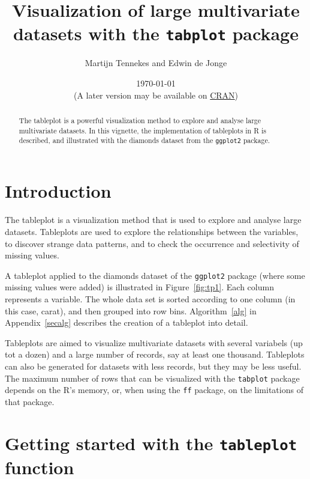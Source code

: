 \documentclass[11pt, fleqn, a4paper]{article}\usepackage[]{graphicx}\usepackage[]{color}
\title{Visualization of large multivariate datasets with the {\tt tabplot} package}
\author{Martijn Tennekes and Edwin de Jonge}
\date{\today\\ (A later version may be available on \href{http://cran.r-project.org/package=tabplot}{CRAN})}
\begin{document}

\maketitle
\begin{abstract}

The tableplot is a powerful visualization method to explore and analyse large multivariate datasets. In this vignette, the implementation of tableplots in R is described, and illustrated with the diamonds dataset from the {\tt ggplot2} package. 


\end{abstract}



\maketitle

\newpage

\tableofcontents
\newpage
\section{Introduction}
The tableplot is a visualization method that is used to explore and analyse large datasets. Tableplots are used to explore the relationships between the variables, to discover strange data patterns, and to check the occurrence and selectivity of missing values. 

A tableplot applied to the diamonds dataset of the {\tt ggplot2} package (where some missing values were added) is illustrated in Figure~\ref{fig:tp1}. Each column represents a variable. The whole data set is sorted according to one column (in this case, carat), and then grouped into row bins. Algorithm~\ref{alg} in Appendix~\ref{secalg} describes the creation of a tableplot into detail.

Tableplots are aimed to visualize multivariate datasets with several variabels (up tot a dozen) and a large number of records, say at least one thousand. Tableplots can also be generated for datasets with less records, but they may be less useful. The maximum number of rows that can be visualized with the {\tt tabplot} package depends on the R's memory, or, when using the {\tt ff} package, on the limitations of that package.

\section{Getting started with the {\tt tableplot} function}
\end{document}
